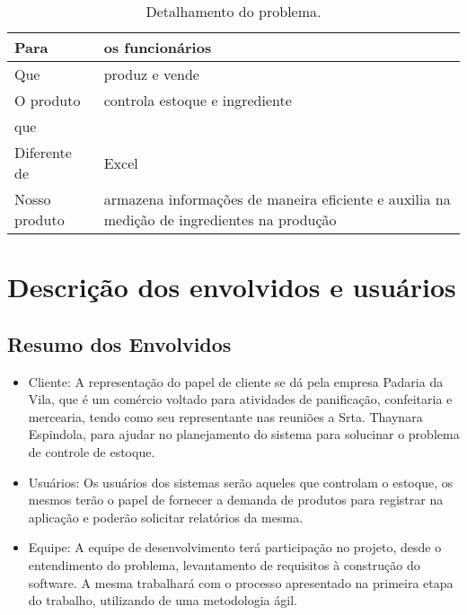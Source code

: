 \begin{appendices}
	\begin{table}[htb]
	\centering
    \begin{tabular}{|l|l|}
        \hline
        Para          & {\parbox{12cm}{os funcionários}}                                        \\ \hline
        Que          & {\parbox{12cm}{produz e vende}}                                                \\ \hline
        O produto            & {\parbox{12cm}{controla estoque e ingrediente}}                                                                \\ 
        que             & {\parbox{12cm}{}}                         \\ \hline
        Diferente de             & {\parbox{12cm}{Excel}}                         \\ \hline
        Nosso produto             & {\parbox{12cm}{armazena informações de maneira eficiente e auxilia na medição de ingredientes na produção}}                         \\ \hline
    \end{tabular}
    \caption{Detalhamento do problema.}
    \end{table}

\section{Descrição dos envolvidos e usuários}

\subsection{Resumo dos Envolvidos}

\begin{itemize}

\item Cliente: A representação do papel de cliente se dá pela empresa Padaria da Vila, que é um comércio voltado para atividades de panificação, confeitaria e mercearia, tendo como seu representante nas reuniões a Srta. Thaynara Espindola, para ajudar no planejamento do sistema para solucinar o problema de controle de estoque.

\item Usuários: Os usuários dos sistemas serão aqueles que controlam o estoque, os mesmos terão o papel de fornecer a demanda de produtos para registrar na aplicação e poderão solicitar relatórios da mesma.

\item Equipe: A equipe de desenvolvimento terá participação no projeto, desde o entendimento do problema, levantamento de requisitos à construção do software. A mesma trabalhará com o processo apresentado na primeira etapa do trabalho, utilizando de uma metodologia ágil.


\end{itemize}
\end{appendices}
